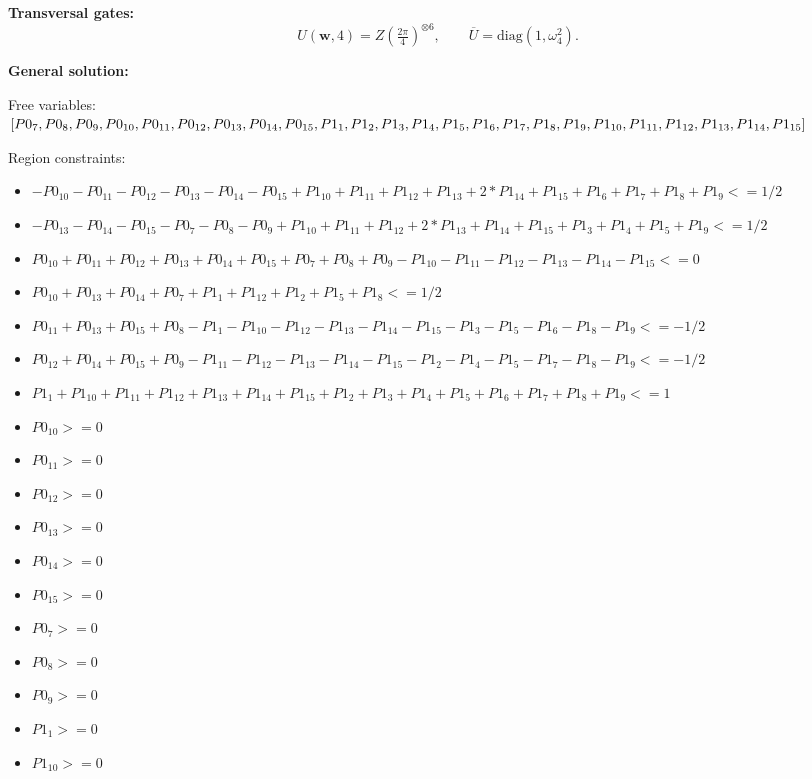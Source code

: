 \documentclass[11pt]{article}
\begin{document}
\noindent\textbf{Transversal gates:}
\[
    U(\mathbf w,4)=Z \left(\tfrac{2\pi}{4}\right)^{\otimes6},\qquad
    \overline U=\mathrm{diag}(1,\omega_{4}^{2}).
\]

\noindent\textbf{General solution:}

Free variables: $[P0_7, P0_8, P0_9, P0_{10}, P0_{11}, P0_{12}, P0_{13}, P0_{14}, P0_{15}, P1_1, P1_2, P1_3, P1_4, P1_5, P1_6, \\ P1_7, P1_8, P1_9, P1_{10}, P1_{11}, P1_{12}, P1_{13}, P1_{14}, P1_{15}]$

Region constraints:
\begin{itemize}
    \item $-P0_{10} - P0_{11} - P0_{12} - P0_{13} - P0_{14} - P0_{15} + P1_{10} + P1_{11} + P1_{12} + P1_{13} + 2*P1_{14} + P1_{15} + P1_6 + P1_7 + P1_8 + P1_9 <= 1/2$
    \item $-P0_{13} - P0_{14} - P0_{15} - P0_7 - P0_8 - P0_9 + P1_{10} + P1_{11} + P1_{12} + 2*P1_{13} + P1_{14} + P1_{15} + P1_3 + P1_4 + P1_5 + P1_9 <= 1/2$
    \item $P0_{10} + P0_{11} + P0_{12} + P0_{13} + P0_{14} + P0_{15} + P0_7 + P0_8 + P0_9 - P1_{10} - P1_{11} - P1_{12} - P1_{13} - P1_{14} - P1_{15} <= 0$
    \item $P0_{10} + P0_{13} + P0_{14} + P0_7 + P1_1 + P1_{12} + P1_2 + P1_5 + P1_8 <= 1/2$
    \item $P0_{11} + P0_{13} + P0_{15} + P0_8 - P1_1 - P1_{10} - P1_{12} - P1_{13} - P1_{14} - P1_{15} - P1_3 - P1_5 - P1_6 - P1_8 - P1_9 <= -1/2$
    \item $P0_{12} + P0_{14} + P0_{15} + P0_9 - P1_{11} - P1_{12} - P1_{13} - P1_{14} - P1_{15} - P1_2 - P1_4 - P1_5 - P1_7 - P1_8 - P1_9 <= -1/2$
    \item $P1_1 + P1_{10} + P1_{11} + P1_{12} + P1_{13} + P1_{14} + P1_{15} + P1_2 + P1_3 + P1_4 + P1_5 + P1_6 + P1_7 + P1_8 + P1_9 <= 1$
    \item $P0_{10} >= 0$
    \item $P0_{11} >= 0$
    \item $P0_{12} >= 0$
    \item $P0_{13} >= 0$
    \item $P0_{14} >= 0$
    \item $P0_{15} >= 0$
    \item $P0_7 >= 0$
    \item $P0_8 >= 0$
    \item $P0_9 >= 0$
    \item $P1_1 >= 0$
    \item $P1_{10} >= 0$

\end{itemize}
\end{document}
